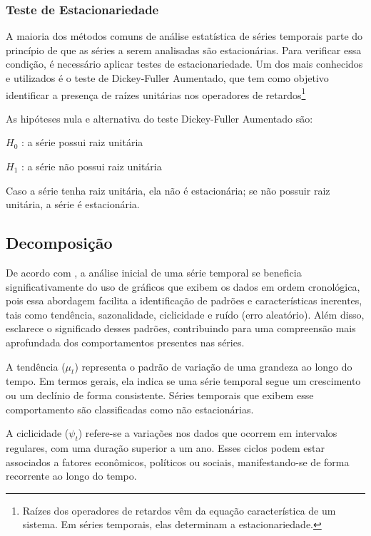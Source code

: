     \subsubsection{Teste de Estacionariedade}
        A maioria dos métodos comuns de análise estatística de séries temporais parte do princípio de que as 
        séries a serem analisadas são estacionárias. Para verificar essa condição, é necessário aplicar 
        testes de estacionariedade. Um dos mais conhecidos e utilizados é o teste de Dickey-Fuller Aumentado, 
        que tem como objetivo identificar a presença de raízes unitárias nos operadores de 
        retardos\footnote{Raízes dos operadores de retardos vêm da equação característica de um sistema. 
        Em séries temporais, elas determinam a estacionariedade.}~\cite{costa2019}

        As hipóteses nula e alternativa do teste Dickey-Fuller Aumentado são:

        \begin{center}
            \(H_0\) : a série possui raiz unitária

            \(H_1\) : a série não possui raiz unitária
        \end{center}

        Caso a série tenha raiz unitária, ela não é estacionária; se não possuir raiz unitária, a série é estacionária.
    \subsection{Decomposição}

        De acordo com , a análise inicial de uma série temporal se beneficia 
        significativamente do uso de gráficos que exibem os dados em ordem cronológica, pois essa abordagem 
        facilita a identificação de padrões e características inerentes, tais como tendência, sazonalidade, 
        ciclicidade e ruído (erro aleatório). Além disso,  esclarece o significado 
        desses padrões, contribuindo para uma compreensão mais aprofundada dos comportamentos presentes nas 
        séries.
        
        A tendência ($\mu_t$) representa o padrão de variação de uma grandeza ao longo do tempo. Em termos gerais, ela indica se 
        uma série temporal segue um crescimento ou um declínio de forma consistente. Séries temporais que exibem esse comportamento 
        são classificadas como não estacionárias.

        
        A ciclicidade ($\psi_t$) refere-se a variações nos dados que ocorrem em intervalos regulares, com uma duração superior a um 
        ano. Esses ciclos podem estar associados a fatores econômicos, políticos ou sociais, manifestando-se de forma recorrente ao 
        longo do tempo.     
        
